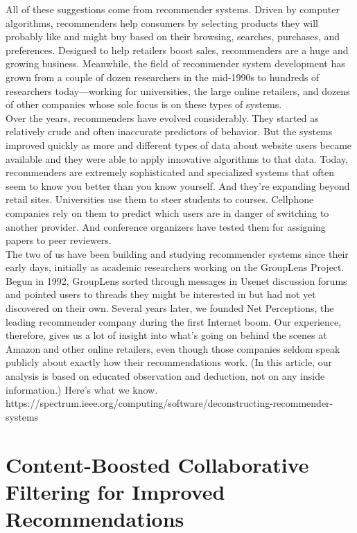\documentclass[oneside]{book}
\begin{document}
All of these suggestions come from recommender systems. Driven by computer algorithms, recommenders help consumers by selecting products they will probably like and might buy based on their browsing, searches, purchases, and preferences. Designed to help retailers boost sales, recommenders are a huge and growing business. Meanwhile, the field of recommender system development has grown from a couple of dozen researchers in the mid-1990s to hundreds of researchers today—working for universities, the large online retailers, and dozens of other companies whose sole focus is on these types of systems.\\

Over the years, recommenders have evolved considerably. They started as relatively crude and often inaccurate predictors of behavior. But the systems improved quickly as more and different types of data about website users became available and they were able to apply innovative algorithms to that data. Today, recommenders are extremely sophisticated and specialized systems that often seem to know you better than you know yourself. And they’re expanding beyond retail sites. Universities use them to steer students to courses. Cellphone companies rely on them to predict which users are in danger of switching to another provider. And conference organizers have tested them for assigning papers to peer reviewers.\\

The two of us have been building and studying recommender systems since their early days, initially as academic researchers working on the GroupLens Project. Begun in 1992, GroupLens sorted through messages in Usenet discussion forums and pointed users to threads they might be interested in but had not yet discovered on their own. Several years later, we founded Net Perceptions, the leading recommender company during the first Internet boom. Our experience, therefore, gives us a lot of insight into what’s going on behind the scenes at Amazon and other online retailers, even though those companies seldom speak publicly about exactly how their recommendations work. (In this article, our analysis is based on educated observation and deduction, not on any inside information.) Here’s what we know.\\


https://spectrum.ieee.org/computing/software/deconstructing-recommender-systems

\section{Content-Boosted Collaborative Filtering for Improved Recommendations}
\end{document}

